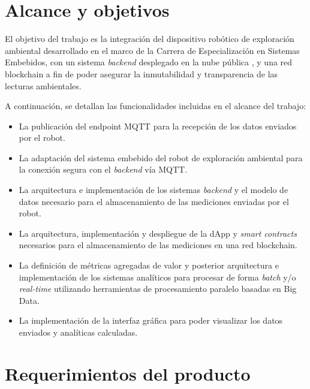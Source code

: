 
\section{Alcance y objetivos}

El objetivo del trabajo es la integración del dispositivo robótico de exploración ambiental \citep{cese_gonzalo_memoria} desarrollado en el marco de la Carrera de Especialización en Sistemas Embebidos, con un sistema \textit{backend} desplegado en la nube pública \citep{nube_publica}, y una red blockchain \cite{blockchain} a fin de poder asegurar la inmutabilidad y transparencia de las lecturas ambientales. 

A continuación, se detallan las funcionalidades incluidas en el alcance del trabajo:


\begin{itemize}
	\item La publicación del endpoint MQTT \citep{mqtt_spec} para la recepción de los datos enviados por el robot.
	\item La adaptación del sistema embebido del robot de exploración ambiental para la conexión segura con el \textit{backend} vía MQTT.
	\item La arquitectura e implementación de los sistemas \textit{backend} y el modelo de datos necesario para el almacenamiento de las mediciones enviadas por el robot.
	\item La arquitectura, implementación y despliegue de la dApp \citep{dapp} y \textit{smart contracts} \citep{smart_contracts} necesarios para el almacenamiento de las mediciones en una red blockchain.
	\item La definición de métricas agregadas de valor y posterior arquitectura e implementación de los sistemas analíticos para procesar de forma \textit{batch} y/o \textit{real-time} utilizando herramientas de procesamiento paralelo basadas en Big Data.
	\item La implementación de la interfaz gráfica para poder visualizar los datos enviados y analíticas calculadas.

\end{itemize}




\section{Requerimientos del producto}


